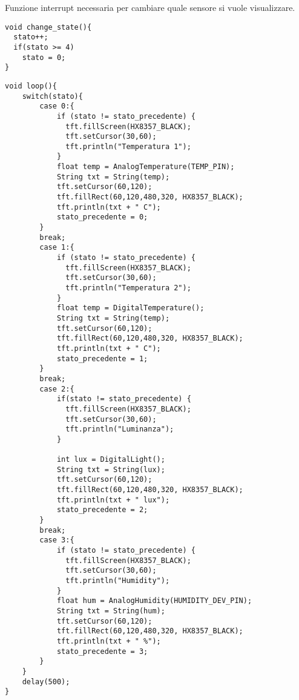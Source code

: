 Funzione interrupt necessaria per cambiare quale sensore si vuole visualizzare. 
\begin{lstlisting}[frame=single, language=Arduino]
void change_state(){
  stato++;
  if(stato >= 4)
    stato = 0;
}
\end{lstlisting}
\clearpage
\begin{lstlisting}[frame=single, language=Arduino]
void loop(){
    switch(stato){
        case 0:{
            if (stato != stato_precedente) {
              tft.fillScreen(HX8357_BLACK);
              tft.setCursor(30,60);
              tft.println("Temperatura 1");
            }
            float temp = AnalogTemperature(TEMP_PIN);
            String txt = String(temp);
            tft.setCursor(60,120);
            tft.fillRect(60,120,480,320, HX8357_BLACK);
            tft.println(txt + " C");
            stato_precedente = 0;
        }
        break;
        case 1:{
            if (stato != stato_precedente) {
              tft.fillScreen(HX8357_BLACK);
              tft.setCursor(30,60);
              tft.println("Temperatura 2");
            }
            float temp = DigitalTemperature();
            String txt = String(temp);
            tft.setCursor(60,120);
            tft.fillRect(60,120,480,320, HX8357_BLACK);
            tft.println(txt + " C");
            stato_precedente = 1;
        }
        break;
        case 2:{
            if(stato != stato_precedente) {
              tft.fillScreen(HX8357_BLACK);
              tft.setCursor(30,60);
              tft.println("Luminanza");
            }
        
            int lux = DigitalLight();
            String txt = String(lux);
            tft.setCursor(60,120);
            tft.fillRect(60,120,480,320, HX8357_BLACK);
            tft.println(txt + " lux");
            stato_precedente = 2;
        }
        break;
        case 3:{
            if (stato != stato_precedente) {
              tft.fillScreen(HX8357_BLACK);
              tft.setCursor(30,60);
              tft.println("Humidity");
            }
            float hum = AnalogHumidity(HUMIDITY_DEV_PIN);
            String txt = String(hum);
            tft.setCursor(60,120);
            tft.fillRect(60,120,480,320, HX8357_BLACK);
            tft.println(txt + " %");
            stato_precedente = 3;
        }
    }
    delay(500);
}
\end{lstlisting}
